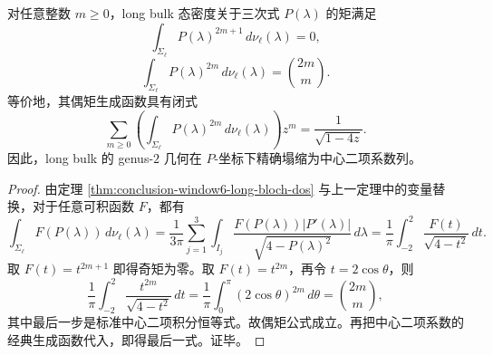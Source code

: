 \begin{theorem}\label{thm:conclusion-window6-long-bulk-central-binomial-moment-law}
对任意整数 \(m\ge 0\)，long bulk 态密度关于三次式 \(P(\lambda)\) 的矩满足
\[
\int_{\Sigma_{\ell}} P(\lambda)^{2m+1}\,d\nu_{\ell}(\lambda)=0,
\]
\[
\int_{\Sigma_{\ell}} P(\lambda)^{2m}\,d\nu_{\ell}(\lambda)=\binom{2m}{m}.
\]
等价地，其偶矩生成函数具有闭式
\[
\sum_{m\ge 0}\left(\int_{\Sigma_{\ell}}P(\lambda)^{2m}\,d\nu_{\ell}(\lambda)\right)z^m
=\frac{1}{\sqrt{1-4z}}.
\]
因此，long bulk 的 genus-\(2\) 几何在 \(P\)-坐标下精确塌缩为中心二项系数列。
\end{theorem}
\begin{proof}
由定理 \ref{thm:conclusion-window6-long-bloch-dos} 与上一定理中的变量替换，对于任意可积函数 \(F\)，都有
\[
\int_{\Sigma_{\ell}}F(P(\lambda))\,d\nu_{\ell}(\lambda)
=
\frac1{3\pi}\sum_{j=1}^{3}\int_{I_j}
\frac{F(P(\lambda))|P'(\lambda)|}{\sqrt{4-P(\lambda)^2}}\,d\lambda
=
\frac1{\pi}\int_{-2}^{2}\frac{F(t)}{\sqrt{4-t^2}}\,dt.
\]
取 \(F(t)=t^{2m+1}\) 即得奇矩为零。取 \(F(t)=t^{2m}\)，再令 \(t=2\cos\theta\)，则
\[
\frac1{\pi}\int_{-2}^{2}\frac{t^{2m}}{\sqrt{4-t^2}}\,dt
=
\frac1{\pi}\int_{0}^{\pi}(2\cos\theta)^{2m}\,d\theta
=\binom{2m}{m},
\]
其中最后一步是标准中心二项积分恒等式。故偶矩公式成立。再把中心二项系数的经典生成函数代入，即得最后一式。证毕。
\end{proof}


